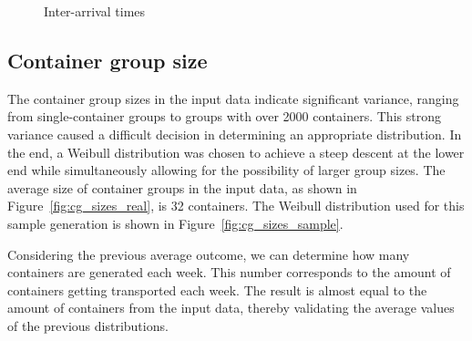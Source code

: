 \documentclass{article}
\begin{document}
\begin{figure}[!tbp]
    \centering
    \hfill
    \caption{Inter-arrival times}
\end{figure}

\subsection{Container group size}
The container group sizes in the input data indicate significant variance,
ranging from single-container groups to groups with over 2000 containers. This
strong variance caused a difficult decision in determining an appropriate
distribution. In the end, a Weibull distribution was chosen to achieve a steep
descent at the lower end while simultaneously allowing for the possibility of
larger group sizes. The average size of container groups in the input data, as
shown in Figure~\ref{fig:cg_sizes_real}, is 32 containers. The Weibull
distribution used for this sample generation is shown in
Figure~\ref{fig:cg_sizes_sample}.

Considering the previous average outcome, we can determine how many containers
are generated each week. This number corresponds to the amount of containers
getting transported each week. The result is almost equal to the amount of
containers from the input data, thereby validating the average values of the
previous distributions.
\end{document}

